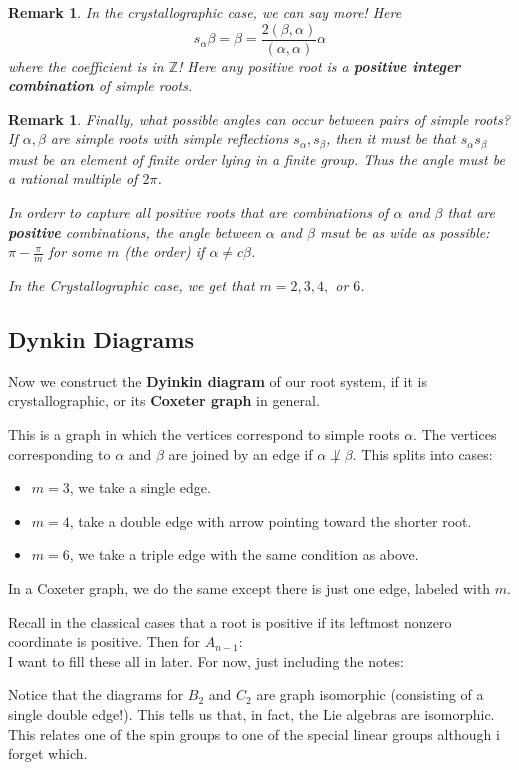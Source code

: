 \documentclass[12pt]{article}
\theoremstyle{nonumberbreak}
\theoremstyle{changebreak}
\theoremstyle{nonumberbreak}
\theoremstyle{change}
\newtheorem{rmk}[thm]{Remark}
\newcommand*{\Z}{
\mathbb{Z}
}
\begin{document}
\begin{rmk}
	In the crystallographic case, we can say more! Here
	\[s_\alpha\beta=\beta=\frac{2(\beta,\alpha)}{(\alpha,\alpha)}\alpha\]
	where the coefficient is in $\Z$! Here any positive root is a \textbf{positive integer combination} of simple roots.
\end{rmk}

\begin{rmk}
	Finally, what possible angles can occur between pairs of simple roots? If $\alpha,\beta$ are simple roots with simple reflections $s_\alpha,s_\beta$, then it must be that $s_\alpha s_\beta$
	must be an element of finite order lying in a finite group. Thus the angle must be a rational multiple of $2\pi$.

	In orderr to capture all positive roots that are combinations of $\alpha$ and $\beta$ that are \textbf{positive} combinations, the angle between $\alpha$ and $\beta$ msut be as wide as possible:
	$\pi-\frac{\pi}{m}$ for some $m$ (the order) if $\alpha\ne c\beta$.

	In the Crystallographic case, we get that $m=2,3,4,$ or $6$.
\end{rmk}
\subsection{Dynkin Diagrams}
Now we construct the \textbf{Dyinkin diagram} of our root system, if it is crystallographic, or its
\textbf{Coxeter graph} in general.

This is a graph in which the vertices correspond to simple roots $\alpha$. The vertices corresponding to $\alpha$ and $\beta$
are joined by an edge if $\alpha\not\perp\beta$. This splits into cases:
\begin{itemize}
	\item $m=3$, we take a single edge.
	\item $m=4$, take a double edge with arrow pointing toward the shorter root.
	\item $m=6$, we take a triple edge with the same condition as above.
\end{itemize}

In a Coxeter graph, we do the same except there is just one edge, labeled with $m$.

\begin{ex}
	Recall in the classical cases that a root is positive if its leftmost nonzero coordinate is positive. Then for $A_{n-1}$:
	\[\]
	I want to fill these all in later. For now, just including the notes:

	Notice that the diagrams for $B_2$ and $C_2$ are graph isomorphic (consisting of a single double edge!). This 
	tells us that, in fact, the Lie algebras are isomorphic. This relates one of the spin groups to one of the special linear groups although i forget which.
\end{ex}
\end{document}
